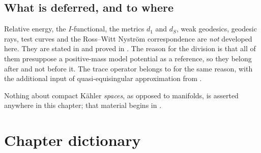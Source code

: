\subsection{What is deferred, and to where}
\label{sec:ch51-deferred}

Relative energy, the \(I\)-functional, the metrics \(d_1\) and \(d_S\),
weak geodesics, geodesic rays, test curves and the Ross--Witt Nystr\"om
correspondence are \emph{not} developed here.  They are stated in
and proved in .  The reason for the division
is that all of them presuppose a positive-mass model potential as a
reference, so they belong after
 and not before it.  The trace operator
belongs to  for the same reason, with the
additional input of quasi-equisingular approximation from
.

Nothing about compact K\"ahler \emph{spaces}, as opposed to manifolds, is
asserted anywhere in this chapter; that material begins in
.

\section{Chapter dictionary}
\label{sec:ch51-dictionary}

